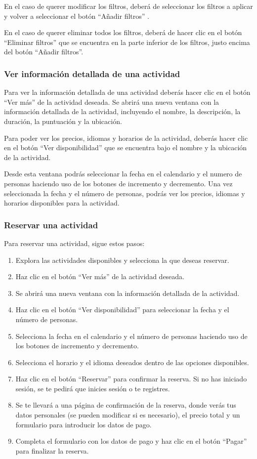 En el caso de querer modificar los filtros, deberá de seleccionar los filtros a aplicar y volver a seleccionar el botón “Añadir filtros” .

En el caso de querer eliminar todos los filtros, deberá de hacer clic en el botón “Eliminar filtros” que se encuentra en la parte inferior de los filtros, justo encima del botón “Añadir filtros”.


\subsubsection{Ver información detallada de una actividad}
Para ver la información detallada de una actividad deberás hacer clic en el botón “Ver más” de la actividad deseada.
Se abrirá una nueva ventana con la información detallada de la actividad, incluyendo el nombre, la descripción, la duración, la puntuación y la ubicación.

Para poder ver los precios, idiomas y horarios de la actividad, deberás hacer clic en el botón “Ver disponibilidad” que se encuentra bajo el nombre y la ubicación de la actividad.

Desde esta ventana podrás seleccionar la fecha en el calendario y el numero de personas haciendo uso de los botones de incremento y decremento.
Una vez seleccionada la fecha y el número de personas, podrás ver los precios, idiomas y horarios disponibles para la actividad.

\subsubsection{Reservar una actividad}
Para reservar una actividad, sigue estos pasos:

\begin{enumerate}
	\item Explora las actividades disponibles y selecciona la que deseas reservar.
	\item Haz clic en el botón “Ver más” de la actividad deseada.
	\item Se abrirá una nueva ventana con la información detallada de la actividad.
	\item Haz clic en el botón “Ver disponibilidad” para seleccionar la fecha y el número de personas.
	\item Selecciona la fecha en el calendario y el número de personas haciendo uso de los botones de incremento y decremento.
	\item Selecciona el horario y el idioma deseados dentro de las opciones disponibles.
	\item Haz clic en el botón “Reservar” para confirmar la reserva. Si no has iniciado sesión, se te pedirá que inicies sesión o te registres.
	\item Se te llevará a una página de confirmación de la reserva, donde verás tus datos personales (se pueden modificar si es necesario), el precio total y un formulario para introducir los datos de pago.
	\item Completa el formulario con los datos de pago y haz clic en el botón “Pagar” para finalizar la reserva.
\end{enumerate}

